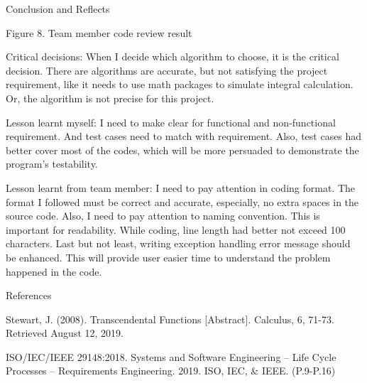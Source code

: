 \documentclass[final]{beamer}
\newlength{\onecolwid}
\begin{document}
\begin{frame}
\begin{columns}[t]
\begin{column}{\onecolwid}
\begin{exampleblock}{Conclusion and Reflects}
\begin{itemize}
            Figure 8. Team member code review result
           {\small   \item  Critical decisions: When I decide which algorithm to choose, it is the critical decision. There are algorithms are accurate, but not satisfying the project requirement, like it needs to use math packages to simulate integral calculation. Or, the algorithm is not precise for this project. }
              
             {\small   \item Lesson learnt myself:  I need to make clear for functional and non-functional requirement. And test cases need to match with requirement. Also, test cases had better cover most of the codes, which will be more persuaded to demonstrate the program's testability. }
              
           {\small     \item Lesson learnt from team member: I need to pay attention in coding format. The format I followed must be correct and accurate, especially, no extra spaces in the source code. Also, I need to pay attention to naming convention. This is important for readability. While coding, line length had better not exceed 100 characters. Last but not least, writing exception handling error message should be enhanced. This will provide user easier time to understand the problem happened in the code. }
   
                  \end{itemize}
        
\end{exampleblock}


\begin{exampleblock}{References}
  \begin{itemize}
           {\small
              
             
              \item      Stewart, J. (2008). Transcendental Functions [Abstract]. Calculus, 6, 71-73. Retrieved August 12, 2019.
              
                     \item ISO/IEC/IEEE 29148:2018. Systems and Software Engineering -- Life Cycle Processes -- Requirements Engineering. 2019. ISO, IEC, & IEEE. (P.9-P.16)
\\


}
\end{itemize}
\end{exampleblock}
\end{column}
\end{columns}
\end{frame}
\end{document}
